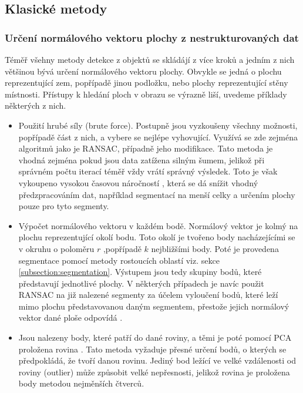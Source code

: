 \documentclass[twoside]{ctuthesis}
\begin{document}
\subsection{Klasické metody}

\subsubsection{Určení normálového vektoru plochy z nestrukturovaných dat}
\label{subsec:nomrmal_est}
Téměř všehny metody detekce z objektů se skládájí z více kroků a jedním z nich většinou bývá určení normálového vektoru plochy. Obvykle se jedná o plochu reprezentující zem, popřípadě jinou podložku, nebo plochy reprezentující stěny místnosti. Přístupy k hledání ploch v obrazu se výrazně liší, uvedeme příklady některých z nich.

\begin{itemize} 
    \item Použití hrubé síly (brute force). Postupně jsou vyzkoušeny všechny možnosti, popřípadě část z nich, a vybere se nejlépe vyhovující. Využívá se zde zejména algoritmů jako je RANSAC, případně jeho modifikace. Tato metoda je vhodná zejména pokud jsou data zatížena silným šumem, jelikož při správném počtu iterací téměř vždy vrátí správný výsledek. Toto je však vykoupeno vysokou časovou náročností \cite{RANSAC_plane,single_RGBD_reconstruction}, která se dá snížit vhodný předzpracováním dat, například segmentací na menší celky a určením plochy pouze pro tyto segmenty. \cite{rusu2009close}
    \item Výpočet normálového vektoru v každém bodě. Normálový vektor je kolmý na plochu reprezentující okolí bodu. Toto okolí je tvořeno body nacházejícími se v okruhu o poloměru $r$ \cite{wang2015dominant} ,popřípadě $k$ nejbližšími body\cite{holz2011real,trevor2013efficient}. Poté je provedena segmentace pomocí metody rostoucích oblastí viz. sekce \ref{subsection:segmentation}. Výstupem jsou tedy skupiny bodů, které představují jednotlivé plochy. V některých případech je navíc použit RANSAC na již nalezené segmenty za účelem vyloučení bodů, které leží mimo plochu představovanou daným segmentem, přestože jejich normálový vektor dané ploše odpovídá \cite{lai2011large}.
    \item Jsou nalezeny body, které patří do dané roviny, a těmi je poté pomocí PCA proložena rovina \cite{zhang2016fast}. Tato metoda vyžaduje přesné určení bodů, o kterých se předpokládá, že tvoří danou rovinu. Jediný bod ležící ve velké vzdálenosti od roviny (outlier) může způsobit velké nepřesnosti, jelikož rovina je proložena body metodou nejměnších čtverců.
\end{itemize}
\end{document}
